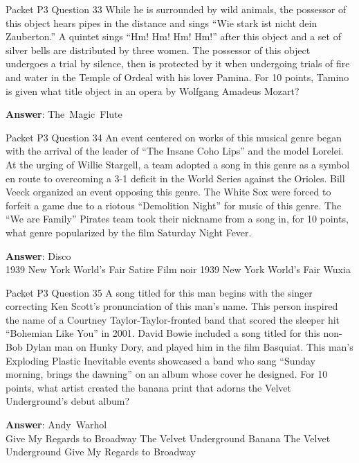 \begin{frame}{Packet P3 Question 33}
While he is surrounded by wild animals, the possessor of this object hears pipes in the distance and sings ``Wie stark ist nicht dein Zauberton.'' A quintet sings ``Hm! Hm! Hm! Hm!'' after   this object and a set of silver bells are distributed by three women. The possessor of this object undergoes a trial   by silence, then is protected by it when undergoing trials of fire and water in the Temple of Ordeal with his lover Pamina.   For 10 points, Tamino is given what title object in an opera by Wolfgang Amadeus Mozart?  

\textbf{Answer}: The\ Magic\ Flute\\
\end{frame}

\begin{frame}{Packet P3 Question 34}
An event centered on works   of this musical genre began with the arrival of the leader of “The Insane Coho Lips” and the model Lorelei. At the urging of Willie Stargell, a team adopted a song in this genre as a symbol en route to overcoming a 3-1 deficit in the World Series against the Orioles. Bill Veeck organized an event opposing this genre. The White Sox were forced to forfeit a game due to a riotous “Demolition Night” for music of this genre. The “We are Family” Pirates team took their nickname from a song in, for 10 points, what genre popularized by the film Saturday Night Fever.        

\textbf{Answer}: Disco\\
 1939 New York World's Fair
 Satire
 Film noir
 1939 New York World's Fair
 Wuxia
\end{frame}

\begin{frame}{Packet P3 Question 35}
A song titled for this   man begins with the singer correcting Ken Scott’s pronunciation of this man’s name. This person inspired the name of a Courtney Taylor-Taylor-fronted band that scored the sleeper hit “Bohemian Like You” in 2001. David Bowie included a song titled for this non-Bob Dylan man on Hunky Dory, and played him in the film Basquiat. This man’s Exploding Plastic Inevitable events showcased   a band who sang “Sunday morning, brings the dawning” on an album whose cover   he designed. For 10 points, what artist created the banana print that adorns the Velvet Underground’s debut album?      

\textbf{Answer}: Andy\ Warhol\\
 Give My Regards to Broadway
 The Velvet Underground
 Banana
 The Velvet Underground
 Give My Regards to Broadway
\end{frame}

